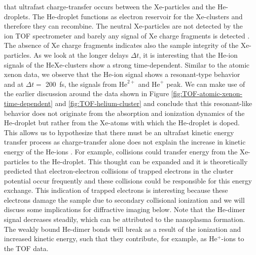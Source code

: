 that ultrafast charge-transfer occurs between the Xe-particles and the He-droplets. The He-droplet functions as electron reservoir for the Xe-clusters and therefore they can recombine. The neutral Xe-particles are not detected by the ion TOF spectrometer and barely any signal of Xe charge fragments is detected \cite{Hoener-2008-JPB,Hau-Riege-2007-PRL}. The absence of Xe charge fragments indicates also the sample integrity of the Xe-particles. As we look at the longer delays $\Delta t$, it is interesting that the He-ion signals of the HeXe-clusters show a strong time-dependent. Similar to the atomic xenon data, we observe that the He-ion signal shows a resonant-type behavior and at $\Delta t =$ \SI{200}{\femto\second}, the signals from $\text{He}^{2+}$ and $\text{He}^{+}$ peak. We can make use of the earlier discussion around the data shown in Figure \ref{fig:TOF-atomic-xenon-time-dependent} and \ref{fig:TOF-helium-cluster} and conclude that this resonant-like behavior does not originate from the absorption and ionization dynamics of the He-droplet but rather from the Xe-atoms with which the He-droplet is doped. This allows us to hypothesize that there must be an ultrafast kinetic energy transfer process as charge-transfer alone does not explain the increase in kinetic energy of the He-ions \cite{Hoener-2008-JPB,Sugishima-2012-PRA,Muller-2015-JPhysB}. For example, collisions could transfer energy from the Xe-particles to the He-droplet. This thought can be expanded and it is theoretically predicted that electron-electron collisions of trapped electrons in the cluster potential occur frequently \cite{Arbeiter-2011-NJP} and these collisions could be responsible for this energy exchange. This indication of trapped electrons is interesting because these electrons damage the sample due to secondary collisional ionization \cite{Hau-Riege-2004-PRE} and we will discuss some implications for diffractive imaging below. Note that the He-dimer signal decreases steadily, which can be attributed to the nanoplasma formation. The weakly bound He-dimer bonds will break as a result of the ionization and increased kinetic energy, such that they contribute, for example, as He$^{+}$-ions to the TOF data.\\[1\baselineskip]
%
